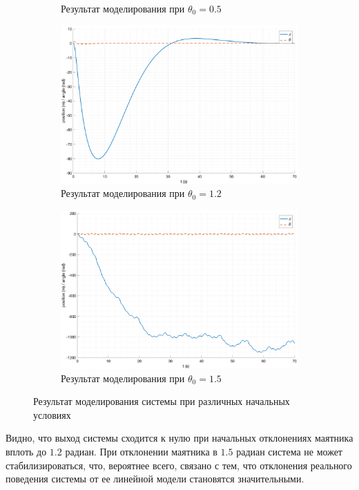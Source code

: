 \begin{figure}[ht!]
\begin{subfigure}[b]{0.45\textwidth}
        \caption{Результат моделирования при $\theta_0 = 0.5$}
    \end{subfigure}
    \begin{subfigure}[b]{0.45\textwidth}
        \centering
        \includegraphics[width=\textwidth]{media/plots/LQR/out_4.png}
        \caption{Результат моделирования при $\theta_0 = 1.2$}
    \end{subfigure}
    \begin{subfigure}[b]{0.45\textwidth}
        \centering
        \includegraphics[width=\textwidth]{media/plots/LQR/out_5.png}
        \caption{Результат моделирования при $\theta_0 = 1.5$}
    \end{subfigure}
    \caption{Результат моделирования системы при различных начальных условиях}
    \label{fig:lqr_controller_2}
\end{figure}
Видно, что выход системы сходится к нулю при начальных отклонениях маятника вплоть до $1.2$ радиан.
При отклонении маятника в $1.5$ радиан система не может стабилизироваться, что, вероятнее всего, 
связано с тем, что отклонения реального поведения системы от ее линейной модели становятся значительными. 
    
